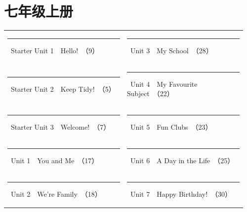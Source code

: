 \documentclass[UTF8,a4paper,11pt,oneside]{ctexbook}
\begin{document}
\clearpage
\tableofcontents

\mainmatter
\clearpage
\pagestyle{fancy}

\chapter{七年级上册}
\par\noindent{\color{volcolor}\rule{\linewidth}{2.6pt}}\par
\vspace{0.3em}
\par
\vspace{1.0em}
\par
\vspace{0.35em}
\noindent\begin{tabular}{@{}p{0.48\linewidth}p{0.48\linewidth}@{}}
{\color{volcolor}\rule[0.3ex]{0.85ex}{0.85ex}}~Starter Unit 1　Hello!~{\footnotesize\color{textgray!80}（9）} & {\color{volcolor}\rule[0.3ex]{0.85ex}{0.85ex}}~Unit 3　My School~{\footnotesize\color{textgray!80}（28）} \\
{\color{volcolor}\rule[0.3ex]{0.85ex}{0.85ex}}~Starter Unit 2　Keep Tidy!~{\footnotesize\color{textgray!80}（5）} & {\color{volcolor}\rule[0.3ex]{0.85ex}{0.85ex}}~Unit 4　My Favourite Subject~{\footnotesize\color{textgray!80}（22）} \\
{\color{volcolor}\rule[0.3ex]{0.85ex}{0.85ex}}~Starter Unit 3　Welcome!~{\footnotesize\color{textgray!80}（7）} & {\color{volcolor}\rule[0.3ex]{0.85ex}{0.85ex}}~Unit 5　Fun Clubs~{\footnotesize\color{textgray!80}（23）} \\
{\color{volcolor}\rule[0.3ex]{0.85ex}{0.85ex}}~Unit 1　You and Me~{\footnotesize\color{textgray!80}（17）} & {\color{volcolor}\rule[0.3ex]{0.85ex}{0.85ex}}~Unit 6　A Day in the Life~{\footnotesize\color{textgray!80}（25）} \\
{\color{volcolor}\rule[0.3ex]{0.85ex}{0.85ex}}~Unit 2　We're Family~{\footnotesize\color{textgray!80}（18）} & {\color{volcolor}\rule[0.3ex]{0.85ex}{0.85ex}}~Unit 7　Happy Birthday!~{\footnotesize\color{textgray!80}（30）} \\
\end{tabular}
\vspace{1.3em}
\end{document}
